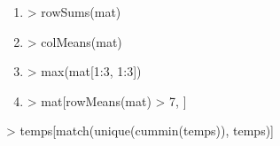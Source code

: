 \begin{reponse}{3.8}
    \begin{enumerate}
\item
\begin{Schunk}
\begin{Sinput}
> rowSums(mat)
\end{Sinput}
\end{Schunk}
\item
\begin{Schunk}
\begin{Sinput}
> colMeans(mat)
\end{Sinput}
\end{Schunk}
\item
\begin{Schunk}
\begin{Sinput}
> max(mat[1:3, 1:3])
\end{Sinput}
\end{Schunk}
\item
\begin{Schunk}
\begin{Sinput}
> mat[rowMeans(mat) > 7, ]
\end{Sinput}
\end{Schunk}
    \end{enumerate}
  
\end{reponse}
\begin{reponse}{3.9}
\begin{Schunk}
\begin{Sinput}
> temps[match(unique(cummin(temps)), temps)]
\end{Sinput}
\end{Schunk}
  
\end{reponse}
